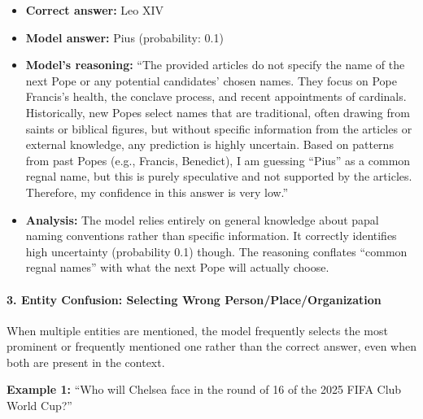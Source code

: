 \begin{itemize}
\item \textbf{Correct answer:} Leo XIV
\item \textbf{Model answer:} Pius (probability: 0.1)
\item \textbf{Model's reasoning:} ``The provided articles do not specify the name of the next Pope or any potential candidates' chosen names. They focus on Pope Francis's health, the conclave process, and recent appointments of cardinals. Historically, new Popes select names that are traditional, often drawing from saints or biblical figures, but without specific information from the articles or external knowledge, any prediction is highly uncertain. Based on patterns from past Popes (e.g., Francis, Benedict), I am guessing ``Pius'' as a common regnal name, but this is purely speculative and not supported by the articles. Therefore, my confidence in this answer is very low.''
\item \textbf{Analysis:} The model relies entirely on general knowledge about papal naming conventions rather than specific information. It correctly identifies high uncertainty (probability 0.1) though. The reasoning conflates ``common regnal names'' with what the next Pope will actually choose.
\end{itemize}

\paragraph{3. Entity Confusion: Selecting Wrong Person/Place/Organization}

When multiple entities are mentioned, the model frequently selects the most prominent or frequently mentioned one rather than the correct answer, even when both are present in the context.


\textbf{Example 1:} ``Who will Chelsea face in the round of 16 of the 2025 FIFA Club World Cup?''

